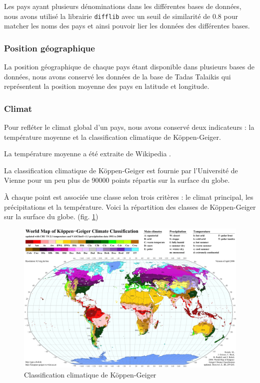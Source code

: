 \documentclass[12pt]{iEEEtran}
\begin{document}
Les pays ayant plusieurs dénominations dans les différentes bases de données, nous avons utilisé
la librairie \texttt{difflib} avec un seuil de similarité de 0.8 pour matcher les noms des pays
et ainsi pouvoir lier les données des différentes bases.

\subsubsection{Position géographique}
La position géographique de chaque pays étant disponible dans plusieurs bases de données, nous
avons conservé les données de la base de Tadas Talaikis \cite{country_pos} qui représentent
la position moyenne des pays en latitude et longitude.

\subsubsection{Climat}
Pour refléter le climat global d'un pays, nous avons conservé deux indicateurs : la température
moyenne et la classification climatique de Köppen-Geiger.

La température moyenne a été extraite de Wikipedia \cite{mean_temp}.

La classification
climatique de Köppen-Geiger est fournie par l'Université de Vienne \cite{climate_classification}
pour un peu plus de 90000 points répartis sur la surface du globe. 

À chaque point est associée une classe selon trois critères : le climat principal,
les précipitations et la température. Voici la répartition des classes de Köppen-Geiger
sur la surface du globe. (fig. \ref{fig:KG_classification})

\begin{figure}[h!]
    \centering
    \includegraphics[width=\columnwidth]{img/KG_classification.jpg}
    \caption{Classification climatique de Köppen-Geiger}
    \label{fig:KG_classification}
\end{figure}
\end{document}
